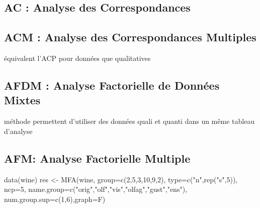 \documentclass[
]{article}
\newenvironment{Shaded}{\begin{snugshade}}{\end{snugshade}}
\newcommand{\AttributeTok}[1]{\textcolor[rgb]{0.77,0.63,0.00}{#1}}
\newcommand{\DecValTok}[1]{\textcolor[rgb]{0.00,0.00,0.81}{#1}}
\newcommand{\FunctionTok}[1]{\textcolor[rgb]{0.00,0.00,0.00}{#1}}
\newcommand{\NormalTok}[1]{#1}
\newcommand{\OtherTok}[1]{\textcolor[rgb]{0.56,0.35,0.01}{#1}}
\newcommand{\StringTok}[1]{\textcolor[rgb]{0.31,0.60,0.02}{#1}}
\begin{document}
\hypertarget{ac-analyse-des-correspondances}{%
\subsection{AC : Analyse des
Correspondances}\label{ac-analyse-des-correspondances}}

\hypertarget{acm-analyse-des-correspondances-multiples}{%
\subsection{ACM : Analyse des Correspondances
Multiples}\label{acm-analyse-des-correspondances-multiples}}

équivalent l'ACP pour données que qualitatives

\hypertarget{afdm-analyse-factorielle-de-donnuxe9es-mixtes}{%
\subsection{AFDM : Analyse Factorielle de Données
Mixtes}\label{afdm-analyse-factorielle-de-donnuxe9es-mixtes}}

méthode permettent d'utiliser des données quali et quanti dans un même
tableau d'analyse

\hypertarget{afm-analyse-factorielle-multiple}{%
\subsection{AFM: Analyse Factorielle
Multiple}\label{afm-analyse-factorielle-multiple}}

\begin{Shaded}
\begin{Highlighting}[]
\FunctionTok{data}\NormalTok{(wine)}
\NormalTok{res }\OtherTok{\textless{}{-}} \FunctionTok{MFA}\NormalTok{(wine, }\AttributeTok{group=}\FunctionTok{c}\NormalTok{(}\DecValTok{2}\NormalTok{,}\DecValTok{5}\NormalTok{,}\DecValTok{3}\NormalTok{,}\DecValTok{10}\NormalTok{,}\DecValTok{9}\NormalTok{,}\DecValTok{2}\NormalTok{), }\AttributeTok{type=}\FunctionTok{c}\NormalTok{(}\StringTok{"n"}\NormalTok{,}\FunctionTok{rep}\NormalTok{(}\StringTok{"s"}\NormalTok{,}\DecValTok{5}\NormalTok{)),}
    \AttributeTok{ncp=}\DecValTok{5}\NormalTok{, }\AttributeTok{name.group=}\FunctionTok{c}\NormalTok{(}\StringTok{"orig"}\NormalTok{,}\StringTok{"olf"}\NormalTok{,}\StringTok{"vis"}\NormalTok{,}\StringTok{"olfag"}\NormalTok{,}\StringTok{"gust"}\NormalTok{,}\StringTok{"ens"}\NormalTok{),}
    \AttributeTok{num.group.sup=}\FunctionTok{c}\NormalTok{(}\DecValTok{1}\NormalTok{,}\DecValTok{6}\NormalTok{),}\AttributeTok{graph=}\NormalTok{F)}
\end{Highlighting}
\end{Shaded}
\end{document}
